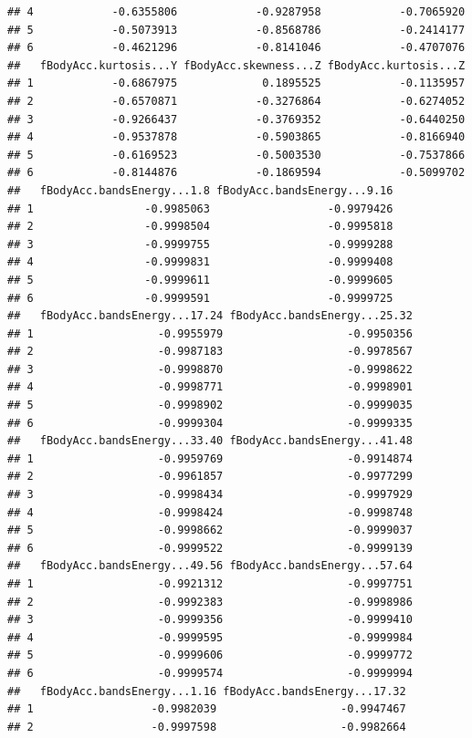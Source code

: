 \documentclass[
]{article}
\begin{document}
\begin{verbatim}
## 4            -0.6355806            -0.9287958            -0.7065920
## 5            -0.5073913            -0.8568786            -0.2414177
## 6            -0.4621296            -0.8141046            -0.4707076
##   fBodyAcc.kurtosis...Y fBodyAcc.skewness...Z fBodyAcc.kurtosis...Z
## 1            -0.6867975             0.1895525            -0.1135957
## 2            -0.6570871            -0.3276864            -0.6274052
## 3            -0.9266437            -0.3769352            -0.6440250
## 4            -0.9537878            -0.5903865            -0.8166940
## 5            -0.6169523            -0.5003530            -0.7537866
## 6            -0.8144876            -0.1869594            -0.5099702
##   fBodyAcc.bandsEnergy...1.8 fBodyAcc.bandsEnergy...9.16
## 1                 -0.9985063                  -0.9979426
## 2                 -0.9998504                  -0.9995818
## 3                 -0.9999755                  -0.9999288
## 4                 -0.9999831                  -0.9999408
## 5                 -0.9999611                  -0.9999605
## 6                 -0.9999591                  -0.9999725
##   fBodyAcc.bandsEnergy...17.24 fBodyAcc.bandsEnergy...25.32
## 1                   -0.9955979                   -0.9950356
## 2                   -0.9987183                   -0.9978567
## 3                   -0.9998870                   -0.9998622
## 4                   -0.9998771                   -0.9998901
## 5                   -0.9998902                   -0.9999035
## 6                   -0.9999304                   -0.9999335
##   fBodyAcc.bandsEnergy...33.40 fBodyAcc.bandsEnergy...41.48
## 1                   -0.9959769                   -0.9914874
## 2                   -0.9961857                   -0.9977299
## 3                   -0.9998434                   -0.9997929
## 4                   -0.9998424                   -0.9998748
## 5                   -0.9998662                   -0.9999037
## 6                   -0.9999522                   -0.9999139
##   fBodyAcc.bandsEnergy...49.56 fBodyAcc.bandsEnergy...57.64
## 1                   -0.9921312                   -0.9997751
## 2                   -0.9992383                   -0.9998986
## 3                   -0.9999356                   -0.9999410
## 4                   -0.9999595                   -0.9999984
## 5                   -0.9999606                   -0.9999772
## 6                   -0.9999574                   -0.9999994
##   fBodyAcc.bandsEnergy...1.16 fBodyAcc.bandsEnergy...17.32
## 1                  -0.9982039                   -0.9947467
## 2                  -0.9997598                   -0.9982664

\end{verbatim}
\end{document}
